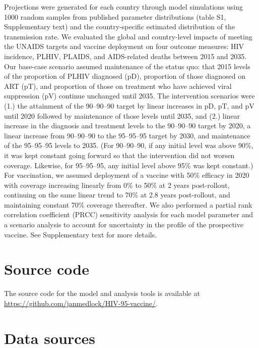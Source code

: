 \documentclass[11pt]{article}
\begin{document}
Projections were generated for each country through model simulations
using 1000 random samples from published parameter distributions
(table S1, Supplementary text) and the country-specific estimated
distribution of the transmission rate. We evaluated the global and
country-level impacts of meeting the UNAIDS targets and vaccine
deployment on four outcome measures: HIV incidence, PLHIV, PLAIDS, and
AIDS-related deaths between 2015 and 2035. Our base-case scenario
assumed maintenance of the status quo: that 2015 levels of the
proportion of PLHIV diagnosed (pD), proportion of those diagnosed on
ART (pT), and proportion of those on treatment who have achieved viral
suppression (pV) continue unchanged until 2035. The intervention
scenarios were (1.) the attainment of the 90–90–90 target by linear
increases in pD, pT, and pV until 2020 followed by maintenance of
those levels until 2035, and (2.) linear increase in the diagnosis and
treatment levels to the 90–90–90 target by 2020, a linear increase
from 90–90–90 to the 95–95–95 target by 2030, and maintenance of the
95–95–95 levels to 2035. (For 90–90–90, if any initial level was above
90\%, it was kept constant going forward so that the intervention did
not worsen coverage.  Likewise, for 95–95–95, any initial level above
95\% was kept constant.)  For vaccination, we assumed deployment of a
vaccine with 50\% efficacy in 2020 with coverage increasing linearly
from 0\% to 50\% at 2 years post-rollout, continuing on the same
linear trend to 70\% at 2.8 years post-rollout, and maintaining
constant 70\% coverage thereafter. We also performed a partial rank
correlation coefficient (PRCC) sensitivity analysis for each model
parameter and a scenario analysis to account for uncertainty in the
profile of the prospective vaccine. See Supplementary text for more
details.


\section{Source code}

The source code for the model and analysis tools is available at
\url{https://github.com/janmedlock/HIV-95-vaccine/}.


\section{Data sources}
\end{document}

